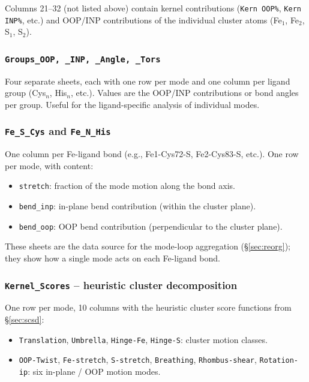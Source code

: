 \documentclass[11pt,a4paper,twoside]{article}
\theoremstyle{remark}
\begin{document}
Columns 21--32 (not listed above) contain kernel contributions
(\texttt{Kern OOP\%}, \texttt{Kern INP\%}, etc.) and OOP/INP
contributions of the individual cluster atoms (Fe$_1$, Fe$_2$,
S$_1$, S$_2$).

\subsubsection*{\texttt{Groups\_OOP, \_INP, \_Angle, \_Tors}}

Four separate sheets, each with one row per mode and one column
per ligand group (Cys$_n$, His$_n$, etc.). Values are the OOP/INP
contributions or bond angles per group. Useful for the
ligand-specific analysis of individual modes.

\subsubsection*{\texttt{Fe\_S\_Cys} and \texttt{Fe\_N\_His}}

One column per Fe-ligand bond (e.g., Fe1-Cys72-S, Fe2-Cys83-S,
etc.). One row per mode, with content:
\begin{itemize}\setlength{\itemsep}{0pt}
  \item \texttt{stretch}: fraction of the mode motion along the
        bond axis.
  \item \texttt{bend\_inp}: in-plane bend contribution
        (within the cluster plane).
  \item \texttt{bend\_oop}: OOP bend contribution
        (perpendicular to the cluster plane).
\end{itemize}

These sheets are the data source for the mode-loop aggregation
(\S\ref{sec:reorg}); they show how a single mode acts on each
Fe-ligand bond.

\subsubsection*{\texttt{Kernel\_Scores} -- heuristic cluster decomposition}

One row per mode, 10 columns with the heuristic cluster score
functions from \S\ref{sec:scsd}:

\begin{itemize}\setlength{\itemsep}{0pt}
  \item \texttt{Translation}, \texttt{Umbrella}, \texttt{Hinge-Fe},
        \texttt{Hinge-S}: cluster motion classes.
  \item \texttt{OOP-Twist}, \texttt{Fe-stretch},
        \texttt{S-stretch}, \texttt{Breathing},
        \texttt{Rhombus-shear}, \texttt{Rotation-ip}:
        six in-plane / OOP motion modes.
\end{itemize}
\end{document}
